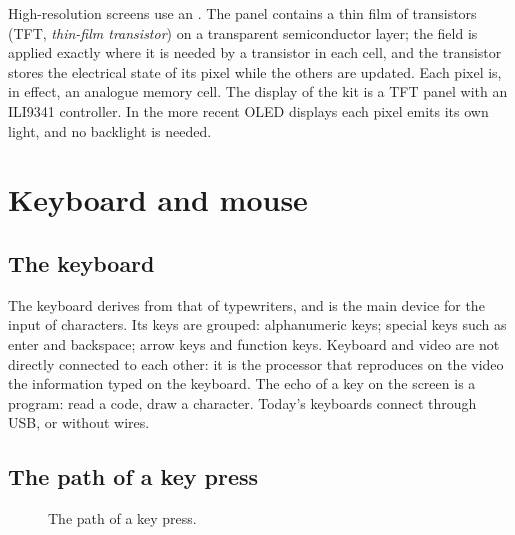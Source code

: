 High-resolution screens use an . The panel contains a
thin film of transistors (TFT, \emph{thin-film transistor}) on a transparent
semiconductor layer; the field is applied exactly where it is needed by a
transistor in each cell, and the transistor stores the electrical state of
its pixel while the others are updated. Each pixel is, in effect, an analogue
memory cell. The display of the kit is a TFT panel with an ILI9341
controller. In the more recent OLED displays each pixel emits its own light,
and no backlight is needed.

\section{Keyboard and mouse}

\subsection{The keyboard}

The keyboard derives from that of typewriters, and is the main device for the
input of characters. Its keys are grouped: alphanumeric keys; special keys
such as enter and backspace; arrow keys and function keys. Keyboard and video
are not directly connected to each other: it is the processor that reproduces
on the video the information typed on the keyboard. The echo of a key on the
screen is a program: read a code, draw a character. Today's keyboards
connect through USB, or without wires.

\subsection{The path of a key press}

\begin{figure}[htb]
\centering
{}
\caption{The path of a key press.}
\label{fig:io:key}
\end{figure}

